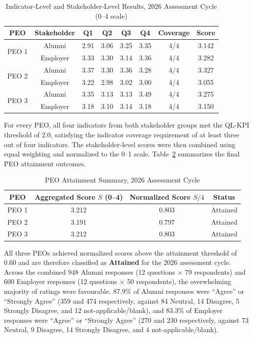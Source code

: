 \begin{table}[htbp]
\centering
\caption{Indicator-Level and Stakeholder-Level Results, 2026 Assessment Cycle (0--4 scale)}
\begin{tabular}{|c|c|c|c|c|c|c|c|}
\hline
\textbf{PEO} & \textbf{Stakeholder} & \textbf{Q1} & \textbf{Q2} & \textbf{Q3} & \textbf{Q4} & \textbf{Coverage} & \textbf{Score} \\
\hline
\multirow{2}{*}{PEO 1} & Alumni & 2.91 & 3.06 & 3.25 & 3.35 & 4/4 & 3.142 \\
\cline{2-8}
 & Employer & 3.33 & 3.30 & 3.14 & 3.36 & 4/4 & 3.282 \\
\hline
\multirow{2}{*}{PEO 2} & Alumni & 3.37 & 3.30 & 3.36 & 3.28 & 4/4 & 3.327 \\
\cline{2-8}
 & Employer & 3.22 & 2.98 & 3.02 & 3.00 & 4/4 & 3.055 \\
\hline
\multirow{2}{*}{PEO 3} & Alumni & 3.35 & 3.13 & 3.13 & 3.49 & 4/4 & 3.275 \\
\cline{2-8}
 & Employer & 3.18 & 3.10 & 3.14 & 3.18 & 4/4 & 3.150 \\
\hline
\end{tabular}
\label{tab:peo_indicators_2026}
\end{table}

For every PEO, all four indicators from both stakeholder groups met the QL-KPI threshold of 2.0, satisfying the indicator coverage requirement of at least three out of four indicators. The stakeholder-level scores were then combined using equal weighting and normalized to the 0--1 scale. Table~\ref{tab:peo_attainment_2026} summarizes the final PEO attainment outcomes.

\begin{table}[htbp]
\centering
\caption{PEO Attainment Summary, 2026 Assessment Cycle}
\begin{tabular}{|c|c|c|c|}
\hline
\textbf{PEO} & \textbf{Aggregated Score $S$ (0--4)} & \textbf{Normalized Score $S/4$} & \textbf{Status} \\
\hline
PEO 1 & 3.212 & 0.803 & Attained \\
\hline
PEO 2 & 3.191 & 0.797 & Attained \\
\hline
PEO 3 & 3.212 & 0.803 & Attained \\
\hline
\end{tabular}
\label{tab:peo_attainment_2026}
\end{table}

All three PEOs achieved normalized scores above the attainment threshold of 0.60 and are therefore classified as \textbf{Attained} for the 2026 assessment cycle. Across the combined 948 Alumni responses (12 questions $\times$ 79 respondents) and 600 Employer responses (12 questions $\times$ 50 respondents), the overwhelming majority of ratings were favourable. 87.9\% of Alumni responses were ``Agree'' or ``Strongly Agree'' (359 and 474 respectively, against 84 Neutral, 14 Disagree, 5 Strongly Disagree, and 12 not-applicable/blank), and 83.3\% of Employer responses were ``Agree'' or ``Strongly Agree'' (270 and 230 respectively, against 73 Neutral, 9 Disagree, 14 Strongly Disagree, and 4 not-applicable/blank).


